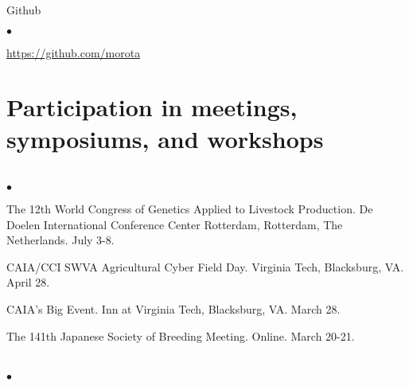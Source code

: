 \documentclass[margin,line,10pt]{res}
\newenvironment{list1}{
  \begin{list}{\ding{113}}{%
      \setlength{\itemsep}{0in}
      \setlength{\parsep}{0in} \setlength{\parskip}{0in}
      \setlength{\topsep}{0in} \setlength{\partopsep}{0in} 
      \setlength{\leftmargin}{0.17in}}}{\end{list}}
\newenvironment{list2}{
  \begin{list}{$\bullet$}{%
      \setlength{\itemsep}{0in}
      \setlength{\parsep}{0in} \setlength{\parskip}{0in}
      \setlength{\topsep}{0in} \setlength{\partopsep}{0in} 
      \setlength{\leftmargin}{0.2in}}}{\end{list}}
\begin{document}
\begin{resume}
\begin{list1}
\vspace{0.3cm}
\item[] Github
\begin{list2}
\item \textcolor{blue}{\href{https://github.com/morota}{https://github.com/morota}} 
\end{list2}
\end{list1}









\vspace{0.5cm}
\section{\sc Participation in meetings, symposiums, and workshops} 
\vspace{2cm}


\section{}
\begin{list2}

\item   The 12th World Congress of Genetics Applied to Livestock Production. De Doelen International Conference Center Rotterdam, Rotterdam, The Netherlands. July 3-8. 

    \vspace{0.5cm}

    
  \item  CAIA/CCI SWVA Agricultural Cyber Field Day. Virginia Tech, Blacksburg, VA. April 28. 

       
  \vspace{0.5cm}

\item  CAIA's Big Event. Inn at Virginia Tech, Blacksburg, VA. March 28. 

       
  \vspace{0.5cm}
  
\item The 141th Japanese Society of Breeding Meeting. Online. March 20-21.  
  
\end{list2}


\section{}
\begin{list2}


\end{list2}
\end{resume}
\end{document}
